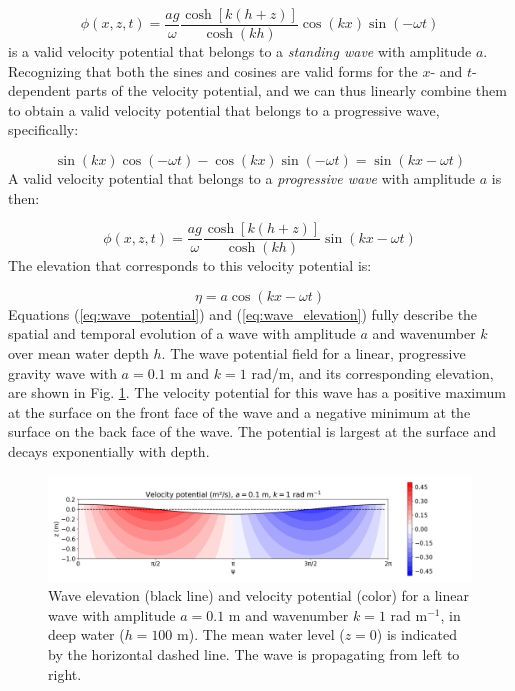 \documentclass[12pt]{article}
\numberwithin{equation}{section}
\numberwithin{figure}{section}
\numberwithin{table}{section}
\begin{document}
\begin{equation}
  \phi(x, z, t) = \frac{a g}{\omega} \frac{\cosh[k(h+z)]}{\cosh(kh)} \cos(kx) \sin(- \omega t)
\end{equation}
is a valid velocity potential that belongs to a \textit{standing wave} with
amplitude $a$.
Recognizing that both the sines and cosines are valid forms for the $x$- and
$t$-dependent parts of the velocity potential, and we can thus linearly combine
them to obtain a valid velocity potential that belongs to a progressive wave,
specifically:

\begin{equation}
  \sin(kx) \cos(-\omega t) - \cos(kx) \sin(-\omega t) = \sin(kx - \omega t)
\end{equation}
A valid velocity potential that belongs to a \textit{progressive wave} with
amplitude $a$ is then:

\begin{equation}
  \phi(x, z, t) = \frac{a g}{\omega} \frac{\cosh[k(h+z)]}{\cosh(kh)} \sin(kx - \omega t)
  \label{eq:wave_potential}
\end{equation}
The elevation that corresponds to this velocity potential is:

\begin{equation}
  \eta = a \cos(kx - \omega t)
  \label{eq:wave_elevation}
\end{equation}
Equations (\ref{eq:wave_potential}) and (\ref{eq:wave_elevation}) fully describe
the spatial and temporal evolution of a wave with amplitude $a$ and wavenumber
$k$ over mean water depth $h$.
The wave potential field for a linear, progressive gravity wave with $a = 0.1$ m
and $k = 1$ rad/m, and its corresponding elevation, are shown in Fig.
\ref{fig:wave_potential}.
The velocity potential for this wave has a positive maximum at the surface on
the front face of the wave and a negative minimum at the surface on the back face
of the wave.
The potential is largest at the surface and decays exponentially with depth.

\begin{figure}[h]
  \centering
  \includegraphics[width=\textwidth]{assets/fig_wave_potential.png}
  \caption{
    Wave elevation (black line) and velocity potential (color) for a linear
    wave with amplitude $a = 0.1$ m and wavenumber $k = 1$ rad m$^{-1}$,
    in deep water ($h = 100$ m).
    The mean water level ($z = 0$) is indicated by the horizontal dashed line.
    The wave is propagating from left to right.
  }
  \label{fig:wave_potential}
\end{figure}
\end{document}
